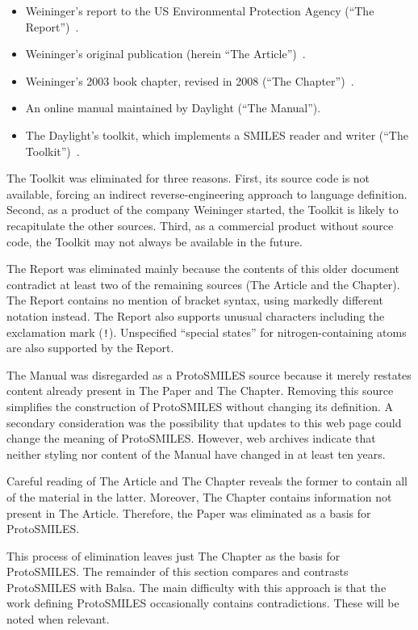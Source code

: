 \documentclass{article}
\def\ttt{\texttt}
\begin{document}
\begin{itemize}
    \item Weininger's report to the US Environmental Protection Agency (\enquote{The Report})~\cite{anderson:1987}.
    \item Weininger's original publication (herein \enquote{The Article})~\cite{weininger:1988}.
    \item Weininger's 2003 book chapter, revised in 2008 (\enquote{The Chapter})~\cite{weininger:2003}.
    \item An online manual maintained by Daylight (\enquote{The Manual}).
    \item The Daylight's toolkit, which implements a SMILES reader and writer (\enquote{The Toolkit})~\cite{daylightToolkit}.
\end{itemize}

The Toolkit was eliminated for three reasons. First, its source code is not available, forcing an indirect reverse-engineering approach to language definition. Second, as a product of the company Weininger started, the Toolkit is likely to recapitulate the other sources. Third, as a commercial product without source code, the Toolkit may not always be available in the future.

The Report was eliminated mainly because the contents of this older document contradict at least two of the remaining sources (The Article and the Chapter). The Report contains no mention of bracket syntax, using markedly different notation instead. The Report also supports unusual characters including the exclamation mark (\ttt{!}). Unspecified \enquote{special states} for nitrogen-containing atoms are also supported by the Report.

The Manual was disregarded as a ProtoSMILES source because it merely restates content already present in The Paper and The Chapter. Removing this source simplifies the construction of ProtoSMILES without changing its definition. A secondary consideration was the possibility that updates to this web page could change the meaning of ProtoSMILES. However, web archives indicate that neither styling nor content of the Manual have changed in at least ten years.

Careful reading of The Article and The Chapter reveals the former to contain all of the material in the latter. Moreover, The Chapter contains information not present in The Article. Therefore, the Paper was eliminated as a basis for ProtoSMILES.

This process of elimination leaves just The Chapter as the basis for ProtoSMILES. The remainder of this section compares and contrasts ProtoSMILES with Balsa. The main difficulty with this approach is that the work defining ProtoSMILES occasionally contains contradictions. These will be noted when relevant.
\end{document}
